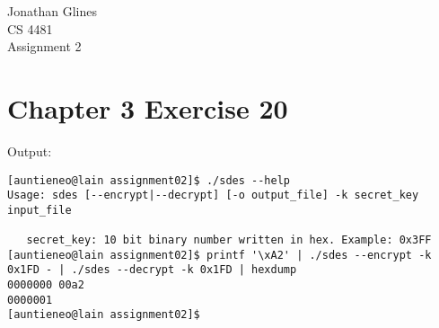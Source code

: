\documentclass[12pt]{article}
\begin{document}
\begin{flushright}
{
\Large Jonathan Glines\\
\Large CS 4481\\
\Large Assignment 2\\
}
\end{flushright}
\section*{Chapter 3 Exercise 20}

Output:
\begin{verbatim}
[auntieneo@lain assignment02]$ ./sdes --help
Usage: sdes [--encrypt|--decrypt] [-o output_file] -k secret_key input_file

   secret_key: 10 bit binary number written in hex. Example: 0x3FF
[auntieneo@lain assignment02]$ printf '\xA2' | ./sdes --encrypt -k 0x1FD - | ./sdes --decrypt -k 0x1FD | hexdump
0000000 00a2                                   
0000001
[auntieneo@lain assignment02]$ 
\end{verbatim}
\end{document}
